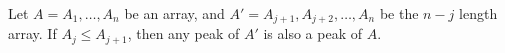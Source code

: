  \begin{claim} \label{claim:subarraymiddle} 
   Let $A = A_1, \dots, A_n$ be an array, and $A' = A_{j+1}, A_{j+2}, \dots, A_n$ be the $n-j$ length array. If $A_j \le A_{j+1}$, then any peak of $A'$ is also a peak of $A$.
\end{claim}
%
